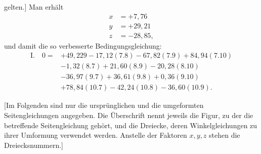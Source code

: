 gelten.] Man erhält
\[
\begin{aligned}
x&=+7{,}76\\
y&=+29{,}21\\
z&=-28{,}85,
\end{aligned}
\]
und damit die so verbesserte Bedingungsgleichung:
\[
\begin{aligned}
\mathrm{I.}\quad 0={}&+49{,}229-17{,}12(7.8)-67{,}82(7.9)+84{,}94(7.10)\\
&-1{,}32(8.7)+21{,}60(8.9)-20{,}28(8.10)\\
&-36{,}97(9.7)+36{,}61(9.8)+0{,}36(9.10)\\
&+78{,}84(10.7)-42{,}24(10.8)-36{,}60(10.9).
\end{aligned}
\]

[Im Folgenden sind nur die ursprünglichen und die umgeformten
Seitengleichungen angegeben. Die Überschrift nennt jeweils die Figur, zu der
die betreffende Seitengleichung gehört, und die Dreiecke, deren Winkelgleichungen
zu ihrer Umformung verwendet werden. Anstelle der Faktoren
$x,y,z$ stehen die Dreiecksnummern.]
